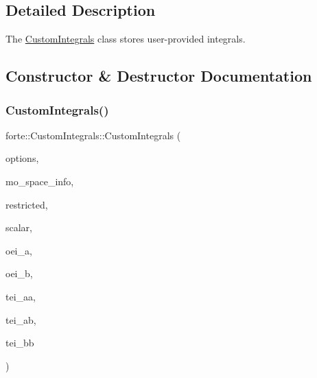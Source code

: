 \subsection{Detailed Description}
The \mbox{\hyperlink{classforte_1_1_custom_integrals}{Custom\+Integrals}} class stores user-\/provided integrals. 

\subsection{Constructor \& Destructor Documentation}
\mbox{\label{classforte_1_1_custom_integrals_ae7a71673fc56be09c26fae459f7bc84e}} 
\subsubsection{\texorpdfstring{Custom\+Integrals()}{CustomIntegrals()}}
{\footnotesize\ttfamily forte\+::\+Custom\+Integrals\+::\+Custom\+Integrals (\begin{DoxyParamCaption}\item[{std\+::shared\+\_\+ptr$<$ \mbox{\hyperlink{classforte_1_1_forte_options}{Forte\+Options}} $>$}]{options,  }\item[{std\+::shared\+\_\+ptr$<$ \mbox{\hyperlink{classforte_1_1_m_o_space_info}{M\+O\+Space\+Info}} $>$}]{mo\+\_\+space\+\_\+info,  }\item[{\mbox{\hyperlink{namespaceforte_a7defa2660dd3eb07aa81176b90781be7}{Integral\+Spin\+Restriction}}}]{restricted,  }\item[{double}]{scalar,  }\item[{const std\+::vector$<$ double $>$ \&}]{oei\+\_\+a,  }\item[{const std\+::vector$<$ double $>$ \&}]{oei\+\_\+b,  }\item[{const std\+::vector$<$ double $>$ \&}]{tei\+\_\+aa,  }\item[{const std\+::vector$<$ double $>$ \&}]{tei\+\_\+ab,  }\item[{const std\+::vector$<$ double $>$ \&}]{tei\+\_\+bb }\end{DoxyParamCaption})}

